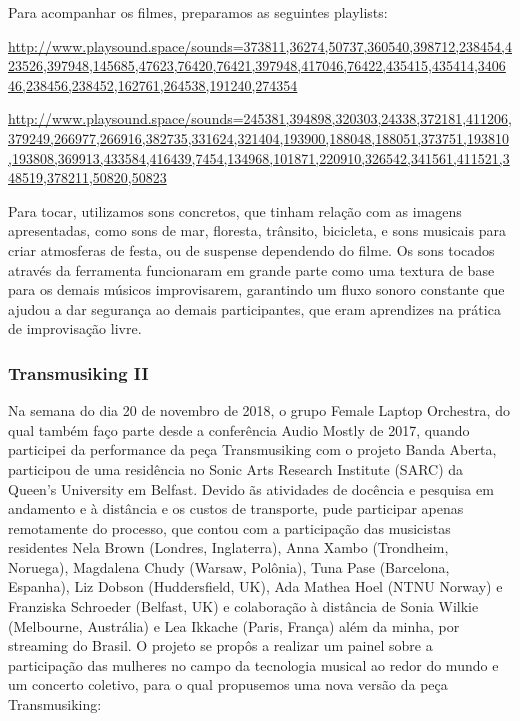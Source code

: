Para acompanhar os filmes, preparamos as seguintes playlists: 

\url{http://www.playsound.space/sounds=373811,36274,50737,360540,398712,238454,423526,397948,145685,47623,76420,76421,397948,417046,76422,435415,435414,340646,238456,238452,162761,264538,191240,274354}

\url{http://www.playsound.space/sounds=245381,394898,320303,24338,372181,411206,379249,266977,266916,382735,331624,321404,193900,188048,188051,373751,193810,193808,369913,433584,416439,7454,134968,101871,220910,326542,341561,411521,348519,378211,50820,50823}

Para tocar, utilizamos sons concretos, que tinham relação com as imagens apresentadas, como sons de mar, floresta, trânsito, bicicleta, e sons musicais para criar atmosferas de festa, ou de suspense dependendo do filme. Os sons tocados através da ferramenta funcionaram em grande parte como uma textura de base para os demais músicos improvisarem, garantindo um fluxo sonoro constante que ajudou a dar segurança ao demais participantes, que eram aprendizes na prática de improvisação livre.





\subsubsection{Transmusiking II}

Na semana do dia 20 de novembro de 2018, o grupo Female Laptop Orchestra, do qual também faço parte desde a conferência Audio Mostly de 2017, quando participei da performance da peça Transmusiking com o projeto Banda Aberta, participou de uma residência no Sonic Arts Research Institute (SARC) da Queen's University em Belfast. Devido ãs atividades de docência e pesquisa em andamento e à distância e os custos de transporte, pude participar apenas remotamente do processo, que contou com a participação das musicistas residentes Nela Brown (Londres, Inglaterra), Anna Xambo (Trondheim, Noruega), Magdalena Chudy (Warsaw, Polônia), Tuna Pase (Barcelona, Espanha), Liz Dobson (Huddersfield, UK), Ada Mathea Hoel (NTNU Norway) e Franziska Schroeder (Belfast, UK) e colaboração à distância de Sonia Wilkie (Melbourne, Austrália) e Lea Ikkache (Paris, França) além da minha, por streaming do Brasil. O projeto se propôs a realizar um painel sobre a participação das mulheres no campo da tecnologia musical ao redor do mundo e um concerto coletivo, para o qual propusemos uma nova versão da peça Transmusiking:


